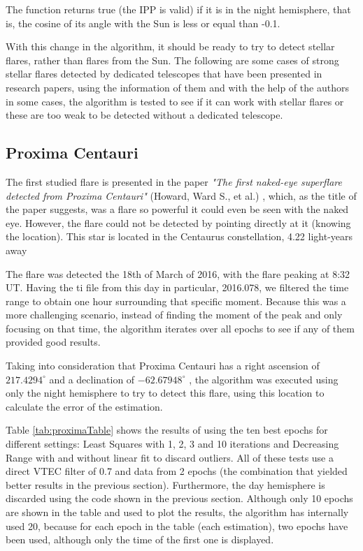 The function returns true (the IPP is valid) if it is in the night hemisphere, that is, the cosine of its angle with the Sun is less or equal than -0.1.

With this change in the algorithm, it should be ready to try to detect stellar flares, rather than flares from the Sun. The following are some cases of strong stellar flares detected by dedicated telescopes that have been presented in research papers, using the information of them and with the help of the authors in some cases, the algorithm is tested to see if it can work with stellar flares or these are too weak to be detected without a dedicated telescope. 

\subsection{Proxima Centauri}

The first studied flare is presented in the paper \textit{"The first naked-eye superflare detected from Proxima Centauri"} (Howard, Ward S., et al.) \cite{howard2018first}, which, as the title of the paper suggests, was a flare so powerful it could even be seen with the naked eye. However, the flare could not be detected by pointing directly at it (knowing the location). This star is located in the Centaurus constellation, 4.22 light-years away

The flare was detected the 18th of March of 2016, with the flare peaking at 8:32 UT. Having the ti file from this day in particular, 2016.078, we filtered the time range to obtain one hour surrounding that specific moment. Because this was a more challenging scenario, instead of finding the moment of the peak and only focusing on that time, the algorithm iterates over all epochs to see if any of them provided good results.

Taking into consideration that Proxima Centauri has a right ascension of $217.4294^{\circ}$ and a declination of $-62.67948^{\circ}$ \cite{proximawiki}, the algorithm was executed using only the night hemisphere to try to detect this flare, using this location to calculate the error of the estimation. 

\clearpage

Table \ref{tab:proximaTable} shows the results of using the ten best epochs for different settings: Least Squares with 1, 2, 3 and 10 iterations and Decreasing Range with and without linear fit to discard outliers. All of these tests use a direct VTEC filter of 0.7 and data from 2 epochs (the combination that yielded better results in the previous section). Furthermore, the day hemisphere is discarded using the code shown in the previous section. Although only 10 epochs are shown in the table and used to plot the results, the algorithm has internally used 20, because for each epoch in the table (each estimation), two epochs have been used, although only the time of the first one is displayed.

